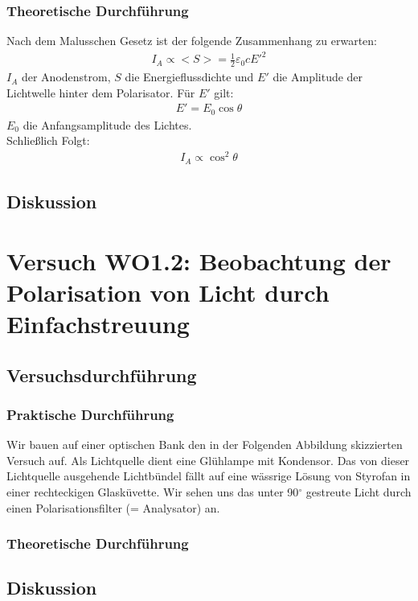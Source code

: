 \documentclass[12pt]{scrartcl}
\begin{document}
\subsubsection{Theoretische Durchführung}
Nach dem Malusschen Gesetz ist der folgende Zusammenhang zu erwarten:
\begin{align}
I_A \propto <S> = \frac{1}{2} \varepsilon_0 c E'^2
\end{align}
$I_A$ der Anodenstrom, $S$ die Energieflussdichte und $E'$ die Amplitude der Lichtwelle hinter dem Polarisator.
Für $E'$ gilt:
\begin{align}
E' = E_0 \cos{\theta}
\end{align}
$E_0$ die Anfangsamplitude des Lichtes.\\
Schließlich Folgt:
\begin{align}
I_A \propto \cos^2{\theta}
\end{align}
\subsection{Diskussion}

\section{Versuch WO1.2: Beobachtung der Polarisation von Licht durch Einfachstreuung}
\subsection{Versuchsdurchführung}
\subsubsection{Praktische Durchführung}
Wir bauen auf einer optischen Bank den in der Folgenden Abbildung skizzierten
Versuch auf.
Als Lichtquelle dient eine Glühlampe mit Kondensor. Das von dieser Lichtquelle ausgehende Lichtbündel fällt auf eine wässrige Lösung von Styrofan in einer rechteckigen Glasküvette.
Wir sehen uns das unter
90$^\circ$ gestreute Licht durch einen Polarisationsfilter (= Analysator) an. 
\subsubsection{Theoretische Durchführung}
\subsection{Diskussion}
\end{document}
